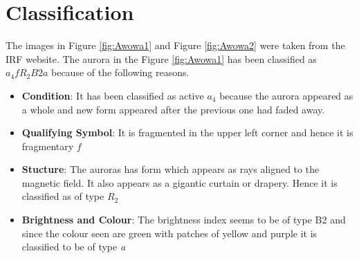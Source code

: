 \documentclass{article}
\begin{document}
\section{Classification}

The images in Figure \ref{fig:Awowa1} and Figure \ref{fig:Awowa2} were taken from the IRF website. 
The aurora in the Figure \ref{fig:Awowa1} has been classified as $a_4fR_2B2a$ because of the following reasons.

\begin{itemize}
\item \textbf{Condition}:  It has been classified as active $ a_4 $ because the aurora appeared as a whole and new form appeared after the previous one had faded away.
\item \textbf{Qualifying Symbol}: It is fragmented in the upper left corner and hence it is fragmentary $ f $
\item \textbf{Stucture}: The auroras has form which appears as rays aligned to the magnetic field. It also appears as a gigantic curtain or drapery. Hence it is classified as of type $ R_2 $
\item \textbf{Brightness and Colour}: The brightness index seems to be of type B2 and since the colour seen are green with patches of yellow and purple it is classified to be of type \textit{a}
\end{itemize}
\end{document}
